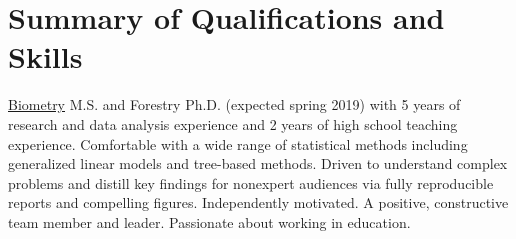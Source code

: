 \documentclass[11pt,a4paper,sans]{moderncv}        %
\begin{document}
\makecvtitle

\section{Summary of Qualifications and Skills}
\href{https://www.stat.wisc.edu/masters-biometry}{Biometry} M.S. and
Forestry Ph.D. (expected spring 2019) with 5 years of research and data analysis experience and 2 years of high school
teaching experience.  Comfortable with a wide range of statistical
methods including generalized linear models and tree-based
methods. Driven to understand complex problems and distill key
findings for nonexpert audiences via fully reproducible reports and
compelling figures.  Independently motivated. A positive, constructive
team member and leader.  Passionate about working in education.
\end{document}
